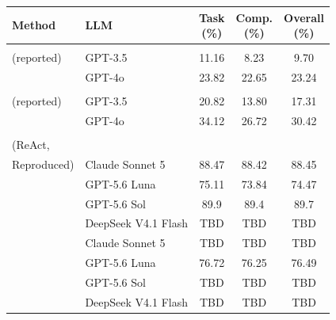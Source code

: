 \documentclass{article}
\newcommand{\method}{\textsc{Ours}}
\newcommand{\na}{\textemdash}
\newcommand{\headpct}{(\%)}
\newcommand{\tabmethodreported}[1]{\makecell[l]{#1\\(reported)}}
\newcommand{\tabmethodbaseline}{\makecell[l]{Baseline\\(ReAct,\\Reproduced)}}
\begin{document}
\begin{table}[t]
\begin{minipage}[t]{0.48\textwidth}
  \end{minipage}\hfill
  \begin{minipage}[t]{0.48\textwidth}
    \centering
    \label{tab:dsbench-matrix}
    \scriptsize
    \setlength{\tabcolsep}{2.5pt}
    \begin{tabular}{@{}>{\raggedright\arraybackslash}l>{\raggedright\arraybackslash}lccc@{}}
      \toprule
      Method & LLM & \makecell{Task\\\headpct} & \makecell{Comp.\\\headpct} & \makecell{Overall\\\headpct} \\
      \midrule
      \multirow{2}{*}{\tabmethodreported{Code Inter.}} & GPT-3.5 & 11.16 & 8.23 & 9.70 \\
        & GPT-4o & 23.82 & 22.65 & 23.24 \\
      \midrule
      \multirow{2}{*}{\tabmethodreported{AutoGen}} & GPT-3.5 & 20.82 & 13.80 & 17.31 \\
        & GPT-4o & 34.12 & 26.72 & 30.42 \\
      \midrule
      \multirow{4}{*}{\tabmethodbaseline}
        & Claude Sonnet 5 & 88.47 & 88.42 & 88.45 \\
        & GPT-5.6 Luna & 75.11 & 73.84 & 74.47 \\
        & GPT-5.6 Sol & 89.9 & 89.4 & 89.7 \\
        & DeepSeek V4.1 Flash & TBD & TBD & TBD \\
      \midrule
      \multirow{4}{*}{\method{}}
        & Claude Sonnet 5 & TBD & TBD & TBD \\
        & GPT-5.6 Luna & 76.72 & 76.25 & 76.49 \\
        & GPT-5.6 Sol & TBD & TBD & TBD \\
        & DeepSeek V4.1 Flash & TBD & TBD & TBD \\
      \bottomrule
    \end{tabular}
  \end{minipage}
  \vspace{-4pt}
\end{table}
\end{document}
